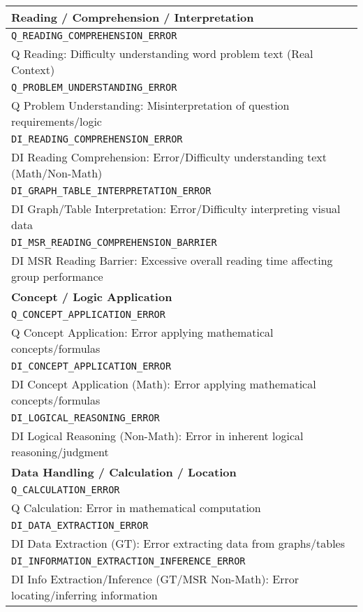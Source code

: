 \documentclass{article}
\begin{document}
{\begin{longtable}{|p{}|}
\hline
\textbf{Reading / Comprehension / Interpretation} \\
\hline
\texttt{Q\_READING\_COMPREHENSION\_ERROR} \\
Q Reading: Difficulty understanding word problem text (Real Context) \\
\hline
\texttt{Q\_PROBLEM\_UNDERSTANDING\_ERROR} \\
Q Problem Understanding: Misinterpretation of question requirements/logic \\
\hline
\texttt{DI\_READING\_COMPREHENSION\_ERROR} \\
DI Reading Comprehension: Error/Difficulty understanding text (Math/Non-Math) \\
\hline
\texttt{DI\_GRAPH\_TABLE\_INTERPRETATION\_ERROR} \\
DI Graph/Table Interpretation: Error/Difficulty interpreting visual data \\
\hline
\texttt{DI\_MSR\_READING\_COMPREHENSION\_BARRIER} \\
DI MSR Reading Barrier: Excessive overall reading time affecting group performance \\
\hline
\textbf{Concept / Logic Application} \\
\hline
\texttt{Q\_CONCEPT\_APPLICATION\_ERROR} \\
Q Concept Application: Error applying mathematical concepts/formulas \\
\hline
\texttt{DI\_CONCEPT\_APPLICATION\_ERROR} \\
DI Concept Application (Math): Error applying mathematical concepts/formulas \\
\hline
\texttt{DI\_LOGICAL\_REASONING\_ERROR} \\
DI Logical Reasoning (Non-Math): Error in inherent logical reasoning/judgment \\
\hline
\textbf{Data Handling / Calculation / Location} \\
\hline
\texttt{Q\_CALCULATION\_ERROR} \\
Q Calculation: Error in mathematical computation \\
\hline
\texttt{DI\_DATA\_EXTRACTION\_ERROR} \\
DI Data Extraction (GT): Error extracting data from graphs/tables \\
\hline
\texttt{DI\_INFORMATION\_EXTRACTION\_INFERENCE\_ERROR} \\
DI Info Extraction/Inference (GT/MSR Non-Math): Error locating/inferring information \\

\end{longtable}}
\end{document}
